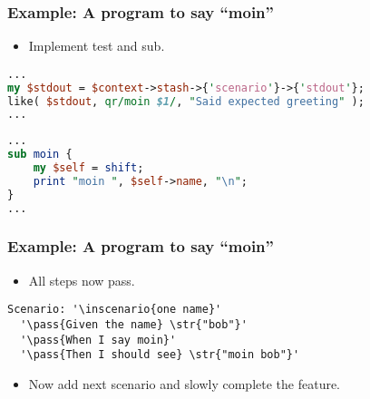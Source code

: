 \documentclass[10pt]{vcs_beamer}
\newcommand{\inscenario}[1]{\color{RoyalBlue}{#1}}
\newcommand{\str}[1]{\color{Turquoise}{#1}}
\newcommand{\pass}[1]{\color{ForestGreen}{#1}}
\newcommand{\Then}{\color{ForestGreen}{Then}}
\begin{document}
\begin{frame}[fragile]
\frametitle{Example: A program to say ``moin''}

\begin{itemize}
    \item Implement \ttt{\Then} test and  sub.
\end{itemize}

\begin{lstlisting}[language=perl]
...
my $stdout = $context->stash->{'scenario'}->{'stdout'};
like( $stdout, qr/moin $1/, "Said expected greeting" );
...
\end{lstlisting}

\begin{lstlisting}[language=perl]
...
sub moin {
    my $self = shift;
    print "moin ", $self->name, "\n";
}
...
\end{lstlisting}

\end{frame}

\begin{frame}[fragile]
\frametitle{Example: A program to say ``moin''}

\begin{itemize}
    \item All steps now pass.
\end{itemize}

\begin{lstlisting}[escapeinside='']
Scenario: '\inscenario{one name}'
  '\pass{Given the name} \str{"bob"}'
  '\pass{When I say moin}'
  '\pass{Then I should see} \str{"moin bob"}'
\end{lstlisting}

\begin{itemize}
    \item Now add next scenario and slowly complete the feature.
\end{itemize}

\end{frame}
\end{document}
